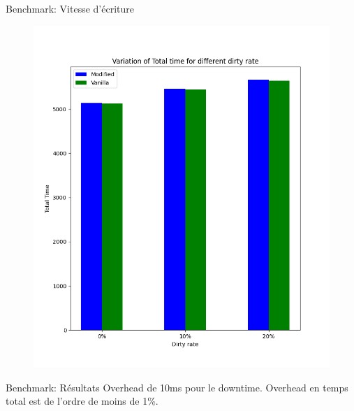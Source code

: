\documentclass{libs/XJTLU_format}
\begin{document}
\begin{frame}{Benchmark: Vitesse d'écriture}
{\begin{figure}[H]
\begin{minipage}{0.48\textwidth}
                \includegraphics[width=1\linewidth]{images/total_rate.png}
            \end{minipage}
        \end{figure}
    }

\end{frame}

\begin{frame}{Benchmark: Résultats}
    Overhead de 10ms pour le downtime.
    \newline
    \bigskip
    Overhead en temps total est de l'ordre de moins de 1\%.

\end{frame}
\end{document}
